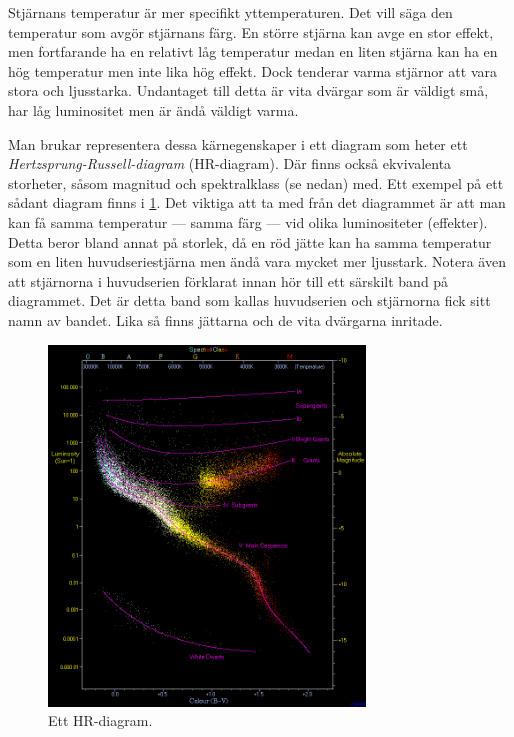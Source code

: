 Stjärnans temperatur är mer specifikt yttemperaturen. Det vill säga den temperatur som avgör stjärnans färg. En större stjärna kan avge en stor effekt, men fortfarande ha en relativt låg temperatur medan en liten stjärna kan ha en hög temperatur men inte lika hög effekt. Dock tenderar varma stjärnor att vara stora och ljusstarka. Undantaget till detta är vita dvärgar som är väldigt små, har låg luminositet men är ändå väldigt varma.

Man brukar representera dessa kärnegenskaper i ett diagram som heter ett \emph{Hertzsprung-Russell-diagram} (HR-diagram). Där finns också ekvivalenta storheter, såsom magnitud och spektralklass (se nedan) med. Ett exempel på ett sådant diagram finns i \cref{fig:hr-diagram}. Det viktiga att ta med från det diagrammet är att man kan få samma temperatur --- samma färg --- vid olika luminositeter (effekter). Detta beror bland annat på storlek, då en röd jätte kan ha samma temperatur som en liten huvudseriestjärna men ändå vara mycket mer ljusstark. Notera även att stjärnorna i huvudserien förklarat innan hör till ett särskilt band på diagrammet. Det är detta band som kallas huvudserien och stjärnorna fick sitt namn av bandet. Lika så finns jättarna och de vita dvärgarna inritade.

\begin{figure}[h!]
    \centering
    \includegraphics[width=0.75\textwidth]{img/HRDiagram.png}
    \caption{Ett HR-diagram.}
    \label{fig:hr-diagram}
\end{figure}

